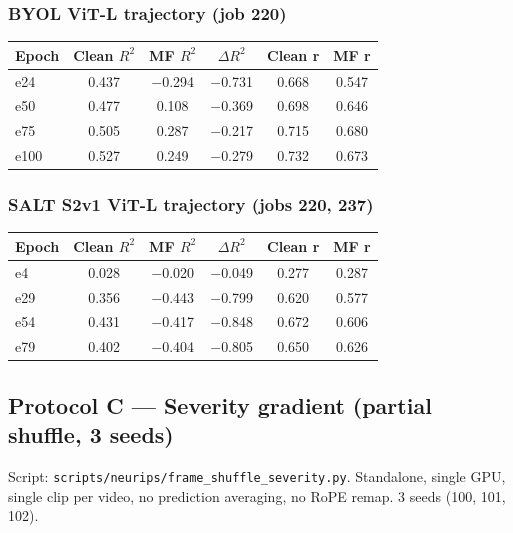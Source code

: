 \documentclass{article}
\begin{document}
\subsubsection{BYOL ViT-L trajectory (job 220)}

\begin{center}
\begin{tabular}{lccccc}
\toprule
Epoch & Clean $R^2$ & MF $R^2$ & $\Delta R^2$ & Clean r & MF r \\
\midrule
e24  & 0.437 & $-$0.294 & $-$0.731 & 0.668 & 0.547 \\
e50  & 0.477 & 0.108  & $-$0.369 & 0.698 & 0.646 \\
e75  & 0.505 & 0.287  & $-$0.217 & 0.715 & 0.680 \\
e100 & 0.527 & 0.249  & $-$0.279 & 0.732 & 0.673 \\
\bottomrule
\end{tabular}
\end{center}

\subsubsection{SALT S2v1 ViT-L trajectory (jobs 220, 237)}

\begin{center}
\begin{tabular}{lccccc}
\toprule
Epoch & Clean $R^2$ & MF $R^2$ & $\Delta R^2$ & Clean r & MF r \\
\midrule
e4   & 0.028 & $-$0.020 & $-$0.049 & 0.277 & 0.287 \\
e29  & 0.356 & $-$0.443 & $-$0.799 & 0.620 & 0.577 \\
e54  & 0.431 & $-$0.417 & $-$0.848 & 0.672 & 0.606 \\
e79  & 0.402 & $-$0.404 & $-$0.805 & 0.650 & 0.626 \\
\bottomrule
\end{tabular}
\end{center}

\subsection{Protocol C --- Severity gradient (partial shuffle, 3 seeds)}

Script: \texttt{scripts/neurips/frame\_shuffle\_severity.py}. Standalone, single GPU, single clip per video, no prediction averaging, no RoPE remap. 3 seeds (100, 101, 102).
\end{document}
